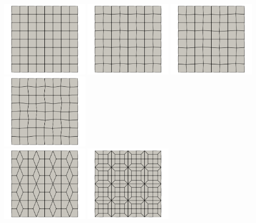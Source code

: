 \documentclass[a4paper,12pt]{article}
\begin{document}
\begin{center}
\includegraphics[width=4.3cm]{../images/4x4/topos.0000.png}
\includegraphics[width=4.3cm]{../images/4x4/topos.0008.png}
\includegraphics[width=4.3cm]{../images/4x4/topos.0009.png}
\includegraphics[width=4.3cm]{../images/4x4/topos.0010.png}\\
\includegraphics[width=4.3cm]{../images/4x4/topos.0001.png}
\includegraphics[width=4.3cm]{../images/4x4/topos.0002.png}

\end{center}
\end{document}
